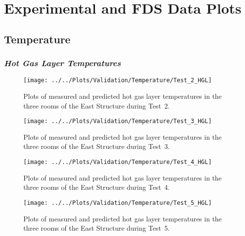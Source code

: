 \appendix
\renewcommand{\thechapter}{B}
\renewcommand{\chaptername}{Appendix}

\chapter{Experimental and FDS Data Plots}
\label{chap:exp_FDS_plots}

\section{Temperature}
\subsection*{\textit{Hot Gas Layer Temperatures}}
\begin{figure}[!h]
	\centering
	\texttt{[image: ../../Plots/Validation/Temperature/Test\_2\_HGL]}
	\caption[Plots of measured and predicted hot gas layer temperatures during Test~2.]{Plots of measured and predicted hot gas layer temperatures in the three rooms of the East Structure during Test~2.}
	\label{fig:HGL_data_Test2}
\end{figure}

\begin{figure}[!h]
	\centering
	\texttt{[image: ../../Plots/Validation/Temperature/Test\_3\_HGL]}
	\caption[Plots of measured and predicted hot gas layer temperatures during Test~3.]{Plots of measured and predicted hot gas layer temperatures in the three rooms of the East Structure during Test~3.}
	\label{fig:HGL_data_Test3}
\end{figure}

\begin{figure}[!h]
	\centering
	\texttt{[image: ../../Plots/Validation/Temperature/Test\_4\_HGL]}
	\caption[Plots of measured and predicted hot gas layer temperatures during Test~4.]{Plots of measured and predicted hot gas layer temperatures in the three rooms of the East Structure during Test~4.}
	\label{fig:HGL_data_Test4}
\end{figure}

\begin{figure}[!h]
	\centering
	\texttt{[image: ../../Plots/Validation/Temperature/Test\_5\_HGL]}
	\caption[Plots of measured and predicted hot gas layer temperatures during Test~5.]{Plots of measured and predicted hot gas layer temperatures in the three rooms of the East Structure during Test~5.}
	\label{fig:HGL_data_Test5}
\end{figure}

